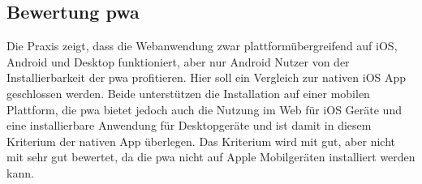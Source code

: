 \subsection{Bewertung \ac{pwa}}
Die Praxis zeigt, dass die Webanwendung zwar plattformübergreifend auf iOS, Android und Desktop funktioniert, aber nur Android Nutzer von der Installierbarkeit der \ac{pwa} profitieren.
Hier soll ein Vergleich zur nativen iOS App geschlossen werden. Beide unterstützen die Installation auf einer mobilen Plattform, die \ac{pwa} bietet jedoch auch die Nutzung im Web für iOS Geräte und eine installierbare Anwendung für Desktopgeräte und ist damit in diesem Kriterium der nativen App überlegen. Das Kriterium wird mit gut, aber nicht mit sehr gut bewertet, da die \ac{pwa} nicht auf Apple Mobilgeräten installiert werden kann.